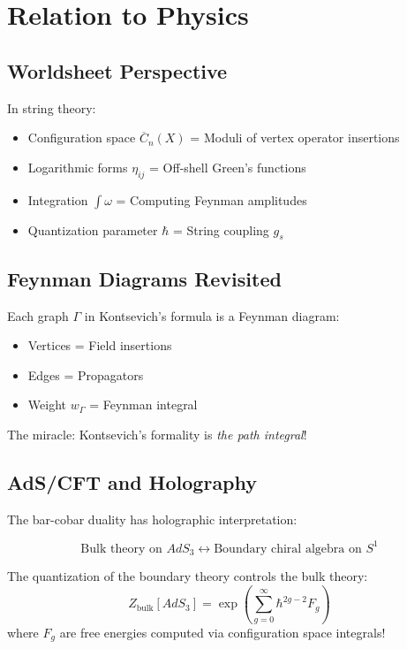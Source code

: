 \section{Relation to Physics}

\subsection{Worldsheet Perspective}

In string theory:
\begin{itemize}
\item Configuration space $\overline{C}_n(X)$ = Moduli of vertex operator insertions
\item Logarithmic forms $\eta_{ij}$ = Off-shell Green's functions
\item Integration $\int \omega$ = Computing Feynman amplitudes
\item Quantization parameter $\hbar$ = String coupling $g_s$
\end{itemize}

\subsection{Feynman Diagrams Revisited}

Each graph $\Gamma$ in Kontsevich's formula is a Feynman diagram:
\begin{itemize}
\item Vertices = Field insertions
\item Edges = Propagators
\item Weight $w_\Gamma$ = Feynman integral
\end{itemize}

The miracle: Kontsevich's formality is \emph{the path integral}!

\subsection{AdS/CFT and Holography}

The bar-cobar duality has holographic interpretation:

\begin{theorem}
$$\text{Bulk theory on } AdS_3 \longleftrightarrow \text{Boundary chiral algebra on } S^1$$

The quantization of the boundary theory controls the bulk theory:
$$Z_{\text{bulk}}[AdS_3] = \exp\left(\sum_{g=0}^\infty \hbar^{2g-2} F_g\right)$$
where $F_g$ are free energies computed via configuration space integrals!
\end{theorem}

